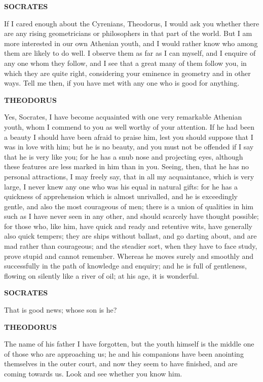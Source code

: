 \documentclass[11pt,letter]{article}
\begin{document}
\par \textbf{SOCRATES}
\par   If I cared enough about the Cyrenians, Theodorus, I would ask you whether there are any rising geometricians or philosophers in that part of the world. But I am more interested in our own Athenian youth, and I would rather know who among them are likely to do well. I observe them as far as I can myself, and I enquire of any one whom they follow, and I see that a great many of them follow you, in which they are quite right, considering your eminence in geometry and in other ways. Tell me then, if you have met with any one who is good for anything.

\par \textbf{THEODORUS}
\par   Yes, Socrates, I have become acquainted with one very remarkable Athenian youth, whom I commend to you as well worthy of your attention. If he had been a beauty I should have been afraid to praise him, lest you should suppose that I was in love with him; but he is no beauty, and you must not be offended if I say that he is very like you; for he has a snub nose and projecting eyes, although these features are less marked in him than in you. Seeing, then, that he has no personal attractions, I may freely say, that in all my acquaintance, which is very large, I never knew any one who was his equal in natural gifts:  for he has a quickness of apprehension which is almost unrivalled, and he is exceedingly gentle, and also the most courageous of men; there is a union of qualities in him such as I have never seen in any other, and should scarcely have thought possible; for those who, like him, have quick and ready and retentive wits, have generally also quick tempers; they are ships without ballast, and go darting about, and are mad rather than courageous; and the steadier sort, when they have to face study, prove stupid and cannot remember. Whereas he moves surely and smoothly and successfully in the path of knowledge and enquiry; and he is full of gentleness, flowing on silently like a river of oil; at his age, it is wonderful.

\par \textbf{SOCRATES}
\par   That is good news; whose son is he?

\par \textbf{THEODORUS}
\par   The name of his father I have forgotten, but the youth himself is the middle one of those who are approaching us; he and his companions have been anointing themselves in the outer court, and now they seem to have finished, and are coming towards us. Look and see whether you know him.
\end{document}
